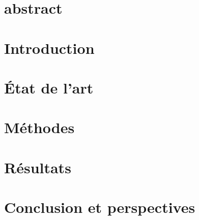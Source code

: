 \documentclass[12pt]{article}
\numberwithin{equation}{section}%
\theoremstyle{definition} %
\begin{document}
	
	\newpage
	\section*{abstract}
	
	\newpage
	\setcounter{tocdepth}{3}%
	\tableofcontents
	\newpage
	\section{Introduction}
	
	\section{État de l'art}
	\label{section:Etat_art}
	
	\section{Méthodes}
	\label{section:Méthodes}
	
	\section{Résultats}
	\label{section:resultats}
	
	\section{Conclusion et perspectives}
	
	\clearpage
	\printbibliography
	\clearpage
	\appendix
	
	
\end{document}
